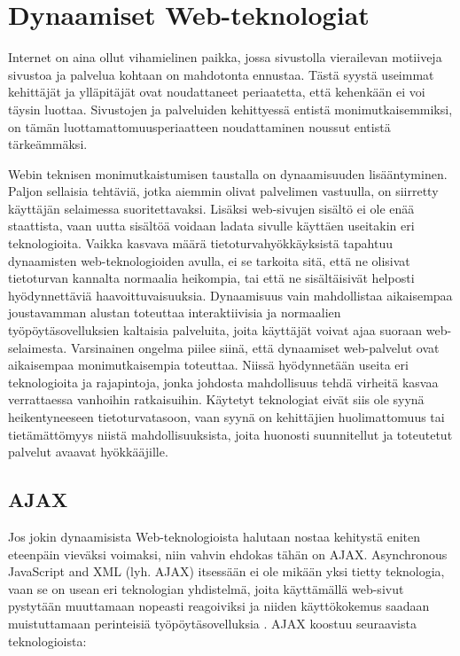 
\chapter{Dynaamiset Web-teknologiat}

Internet on aina ollut vihamielinen paikka, jossa sivustolla vierailevan motiiveja sivustoa ja palvelua kohtaan on mahdotonta ennustaa. Tästä syystä 
useimmat kehittäjät ja ylläpitäjät ovat noudattaneet periaatetta, että kehenkään ei voi täysin luottaa. Sivustojen ja palveluiden kehittyessä entistä monimutkaisemmiksi, on tämän 
luottamattomuusperiaatteen noudattaminen noussut entistä tärkeämmäksi.

Webin teknisen monimutkaistumisen taustalla on dynaamisuuden lisääntyminen. Paljon sellaisia tehtäviä, jotka aiemmin olivat palvelimen vastuulla, on siirretty käyttäjän selaimessa 
suoritettavaksi. Lisäksi web-sivujen sisältö ei ole enää staattista, vaan uutta sisältöä voidaan ladata sivulle käyttäen useitakin eri teknologioita. Vaikka kasvava määrä tietoturvahyökkäyksistä 
tapahtuu dynaamisten web-teknologioiden avulla, ei se tarkoita sitä, että ne olisivat tietoturvan kannalta normaalia heikompia, tai että ne sisältäisivät helposti hyödynnettäviä 
haavoittuvaisuuksia. Dynaamisuus vain mahdollistaa aikaisempaa joustavamman alustan toteuttaa interaktiivisia ja normaalien työpöytäsovelluksien 
kaltaisia palveluita, joita käyttäjät voivat ajaa suoraan web-selaimesta. Varsinainen ongelma piilee siinä, että dynaamiset web-palvelut ovat aikaisempaa monimutkaisempia toteuttaa. Niissä 
hyödynnetään useita eri teknologioita ja rajapintoja, jonka johdosta mahdollisuus tehdä virheitä kasvaa verrattaessa vanhoihin ratkaisuihin. Käytetyt teknologiat eivät siis ole syynä 
heikentyneeseen tietoturvatasoon, vaan syynä on kehittäjien huolimattomuus tai tietämättömyys niistä mahdollisuuksista, joita huonosti suunnitellut ja toteutetut palvelut avaavat hyökkääjille.

\section {AJAX}

Jos jokin dynaamisista Web-teknologioista halutaan nostaa kehitystä eniten eteenpäin vieväksi voimaksi, niin vahvin ehdokas tähän on AJAX. Asynchronous JavaScript and XML (lyh. AJAX)
itsessään ei ole mikään yksi tietty teknologia, vaan se on usean eri teknologian yhdistelmä, joita käyttämällä web-sivut pystytään muuttamaan nopeasti reagoiviksi ja niiden 
käyttökokemus saadaan muistuttamaan perinteisiä työpöytäsovelluksia \cite{AJAX}. AJAX koostuu seuraavista teknologioista:


